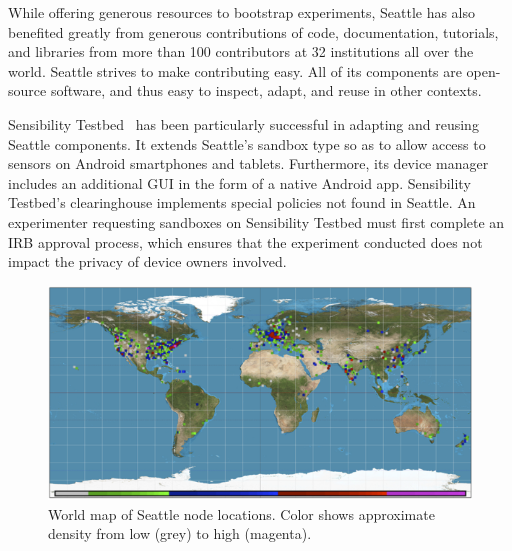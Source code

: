 While offering generous resources to bootstrap experiments,
Seattle has also benefited greatly from generous contributions
of code, documentation, tutorials, and libraries from more than 100
contributors at 32 institutions all over the world.
Seattle strives to make contributing easy. All of its components
are open-source software, and thus easy to inspect, adapt, and
reuse in other contexts.

Sensibility Testbed~\cite{zhuang2014sensibility} has been particularly
successful in adapting and reusing Seattle components. It extends
Seattle's sandbox type so as to allow access
to sensors on Android smartphones and tablets. Furthermore, its
device manager includes an additional \gls{GUI} in the form of
a native Android app. Sensibility Testbed's clearinghouse implements
special policies not found in Seattle. An experimenter requesting
sandboxes on Sensibility Testbed must first complete
an \gls{IRB} approval process, which ensures that the experiment conducted
does not impact the privacy of device owners involved.


\begin{figure}
  \centering
  \includegraphics[width=\columnwidth]{figures/finishedmap_ipinfo_small.png}
  \caption{World map of Seattle node locations. Color shows approximate density from low (grey) to high (magenta).}
  \label{fig:map}
\end{figure}
